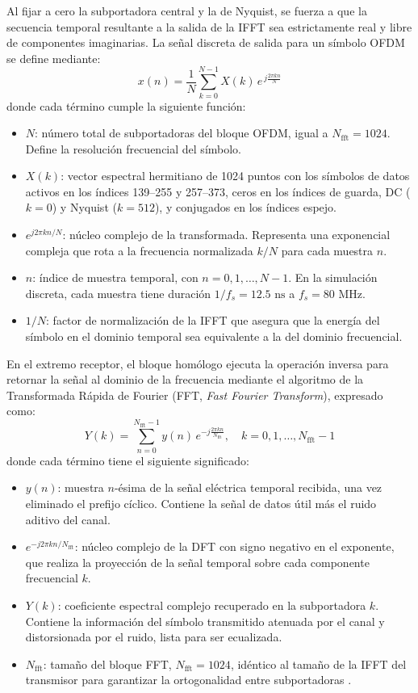Al fijar a cero la subportadora central y la de Nyquist, se fuerza a que la secuencia temporal resultante a la salida de la IFFT sea estrictamente real y libre de componentes imaginarias. La señal discreta de salida para un símbolo OFDM se define \cite{islim2017modulation} mediante:
\begin{equation}
	x(n) = \frac{1}{N} \sum_{k=0}^{N-1} X(k) \, e^{\,j \frac{2 \pi k n}{N}}
	\label{eq:idft_sym}
\end{equation}
donde cada término cumple la siguiente función:
\begin{itemize}
\item $N$: número total de subportadoras del bloque OFDM, igual a $N_{\text{fft}} = 1024$. Define la resolución frecuencial del símbolo.
\item $X(k)$: vector espectral hermitiano de 1024 puntos con los símbolos de datos activos en los índices 139--255 y 257--373, ceros en los índices de guarda, DC ($k=0$) y Nyquist ($k=512$), y conjugados en los índices espejo.
\item $e^{j 2\pi kn/N}$: núcleo complejo de la transformada. Representa una exponencial compleja que rota a la frecuencia normalizada $k/N$ para cada muestra $n$.
\item $n$: índice de muestra temporal, con $n = 0, 1, \dots, N-1$. En la simulación discreta, cada muestra tiene duración $1/f_s = 12.5\text{ ns}$ a $f_s = 80\text{ MHz}$.
\item $1/N$: factor de normalización de la IFFT que asegura que la energía del símbolo en el dominio temporal sea equivalente a la del dominio frecuencial.
\end{itemize}
En el extremo receptor, el bloque homólogo ejecuta la operación inversa para retornar la señal al dominio de la frecuencia mediante el algoritmo de la Transformada Rápida de Fourier (FFT, \textit{Fast Fourier Transform}), expresado como:
\begin{equation}
	Y(k) = \sum_{n=0}^{N_{\text{fft}}-1} y(n) \, e^{-j \frac{2 \pi k n}{N_{\text{fft}}}}, \quad k = 0, 1, \dots, N_{\text{fft}} - 1
	\label{eq:dft_theory}
\end{equation}
donde cada término tiene el siguiente significado:
\begin{itemize}
\item $y(n)$: muestra $n$-ésima de la señal eléctrica temporal recibida, una vez eliminado el prefijo cíclico. Contiene la señal de datos útil más el ruido aditivo del canal.
\item $e^{-j 2\pi kn/N_{\text{fft}}}$: núcleo complejo de la DFT con signo negativo en el exponente, que realiza la proyección de la señal temporal sobre cada componente frecuencial $k$.
\item $Y(k)$: coeficiente espectral complejo recuperado en la subportadora $k$. Contiene la información del símbolo transmitido atenuada por el canal y distorsionada por el ruido, lista para ser ecualizada.
\item $N_{\text{fft}}$: tamaño del bloque FFT, $N_{\text{fft}} = 1024$, idéntico al tamaño de la IFFT del transmisor para garantizar la ortogonalidad entre subportadoras \cite{islim2017modulation}.
\end{itemize}

